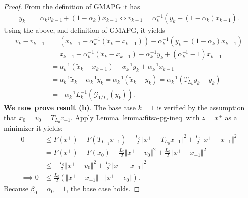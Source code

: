 \documentclass[12pt]{report}
\begin{document}
\begin{proof}
            From the definition of GMAPG it has 
            \begin{align*}
                y_k &= \alpha_k v_{k - 1} + (1 - \alpha_k)x_{k - 1}
                \iff 
                v_{k - 1} = \alpha_k^{-1}(y_k - (1 - \alpha_k)x_{k - 1}). 
            \end{align*}
            Using the above, and definition of GMAPG, it yields 
            \begin{align*}    
                v_k - v_{k - 1} &= 
                (x_{k - 1} + \alpha_k^{-1}(\tilde x_k - x_{k - 1})) - \alpha_k^{-1}(y_k - (1 - \alpha_k)x_{k - 1})
                \\
                &= 
                x_{k - 1} + \alpha_k^{-1}(\tilde x_k - x_{k - 1})
                - \alpha_k^{-1}y_k + (\alpha_k^{-1} - 1)x_{k - 1}
                \\
                &= \alpha_k^{-1}(\tilde x_k - x_{k - 1}) - \alpha_k^{-1}y_k + \alpha_k^{-1} x_{k - 1}
                \\
                &= \alpha_k^{-1}\tilde x_k - \alpha_k^{-1} y_k 
                = \alpha^{-1}_k(\tilde x_k - y_k) = \alpha_k^{-1}(T_{L_k} y_k - y_k)
                \\
                &= -\alpha_k^{-1}L_k^{-1}(\mathcal G_{1/L_k}(y_k)). 
            \end{align*}
            \textbf{We now prove result (b)}. 
            The base case $k = 1$ is verified by the assumption that $x_0 = v_0 = T_{L_0} x_{-1}$. 
            Apply Lemma \ref{lemma:fitsa-pg-ineq} with $z =x^+$ as a minimizer it yields: 
            \begin{align*}
                0 &\le 
                F(x^+) - F(T_{L_{-1}}x_{-1}) - \frac{L_0}{2}\Vert x^+ - T_{L_0}x_{-1}\Vert^2 + 
                \frac{L_0}{2}\Vert x^+ - x_{-1}\Vert^2
                \\
                &= 
                F(x^+) - F(x_0) - \frac{L_0}{2}\Vert x^+ - v_0\Vert^2 + 
                \frac{L_0}{2}\Vert x^+ - x_{-1}\Vert^2
                \\
                &\le 
                - \frac{L_0}{2}\Vert x^+ - v_0\Vert^2 + 
                \frac{L_0}{2}\Vert x^+ - x_{-1}\Vert^2
                \\
                \implies 
                0&\le \frac{L_0}{2}\left(
                    \Vert x^+ - x_{-1}\Vert- \Vert x^+ - v_0\Vert 
                \right). 
            \end{align*}
            Because $\beta_0 = \alpha_0 = 1$, the base case holds. 

\end{proof}
\end{document}
